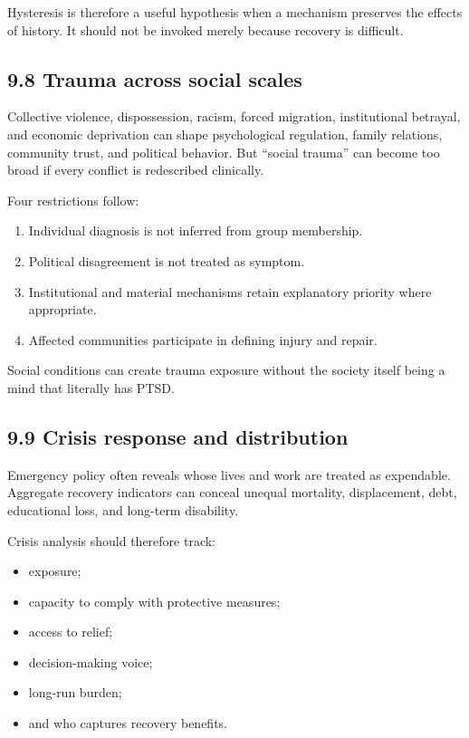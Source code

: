 \documentclass[
  11pt,
]{article}
\providecommand{\tightlist}{%
  \setlength{\itemsep}{0pt}\setlength{\parskip}{0pt}}
\begin{document}
Hysteresis is therefore a useful hypothesis when a mechanism preserves
the effects of history. It should not be invoked merely because recovery
is difficult.

\subsection{9.8 Trauma across social
scales}\label{trauma-across-social-scales}

Collective violence, dispossession, racism, forced migration,
institutional betrayal, and economic deprivation can shape psychological
regulation, family relations, community trust, and political behavior.
But ``social trauma'' can become too broad if every conflict is
redescribed clinically.

Four restrictions follow:

\begin{enumerate}
\def\labelenumi{\arabic{enumi}.}
\tightlist
\item
  Individual diagnosis is not inferred from group membership.
\item
  Political disagreement is not treated as symptom.
\item
  Institutional and material mechanisms retain explanatory priority
  where appropriate.
\item
  Affected communities participate in defining injury and repair.
\end{enumerate}

Social conditions can create trauma exposure without the society itself
being a mind that literally has PTSD.

\subsection{9.9 Crisis response and
distribution}\label{crisis-response-and-distribution}

Emergency policy often reveals whose lives and work are treated as
expendable. Aggregate recovery indicators can conceal unequal mortality,
displacement, debt, educational loss, and long-term disability.

Crisis analysis should therefore track:

\begin{itemize}
\tightlist
\item
  exposure;
\item
  capacity to comply with protective measures;
\item
  access to relief;
\item
  decision-making voice;
\item
  long-run burden;
\item
  and who captures recovery benefits.
\end{itemize}
\end{document}
